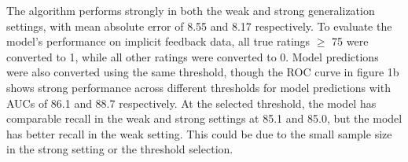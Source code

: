 \documentclass{article}
\begin{document}
The algorithm performs strongly in both the weak and strong generalization
 settings, with mean absolute error of 8.55 and 8.17 respectively.
To evaluate the model's performance on implicit feedback data, all true ratings
 $\geq$ 75 were converted to 1, while all other ratings were converted to 0.
Model predictions were also converted using the same threshold, though the ROC
 curve in figure 1b shows strong performance across different thresholds for
 model predictions with AUCs of 86.1 and 88.7 respectively.
At the selected threshold, the model has comparable recall in the weak and
 strong settings at 85.1 and 85.0, but the model has better recall in the weak
 setting.
This could be due to the small sample size in the strong setting or the
 threshold selection.

\newpage


\end{document}
